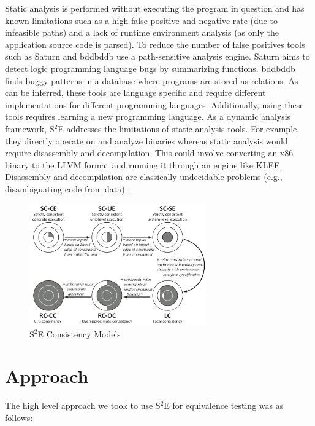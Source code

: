 \documentclass[conference]{IEEEtran}
\begin{document}
Static analysis is performed without executing the program in question and has known limitations such as a high false positive and negative rate (due to infeasible paths) \cite{sage} and a lack of runtime environment analysis (as only the application source code is parsed). To reduce the number of false positives tools such as Saturn \cite{saturn} and bddbddb \cite{bddbddb} use a path-sensitive analysis engine. Saturn aims to detect logic programming language bugs by summarizing functions. bddbddb finds buggy patterns in a database where programs are stored as relations. As can be inferred, these tools are language specific and require different implementations for different programming languages. Additionally, using these tools requires learning a new programming language. As a dynamic analysis framework, S$^2$E addresses the limitations of static analysis tools. For example, they directly operate on and analyze binaries whereas static analysis would require disassembly and decompilation. This could involve converting an x86 binary to the LLVM format and running it through an engine like KLEE. Disassembly and decompilation \cite{disassembly} are classically undecidable problems (e.g., disambiguating code from data) \cite{s2e}.

\begin{figure}[!t]
\centering
\includegraphics[width=3in]{s2e-consistency-models.png}
\caption{S$^2$E Consistency Models \cite{s2e}}
\label{s2e-cm}
\end{figure}


\section{Approach}

The high level approach we took to use S$^2$E for equivalence testing was as follows:
\end{document}
